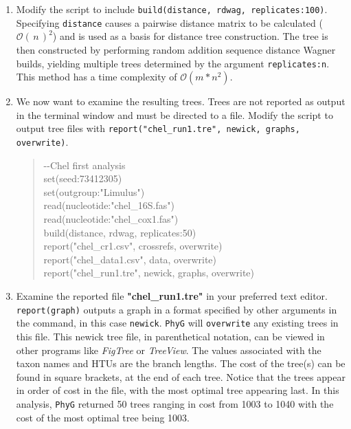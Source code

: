 \documentclass[]{article}
\newcommand{\phyg}{\texttt{PhyG} }
\newcommand{\BigO}[1]{\ensuremath{\mathcal{O}\left(\,#1\,\right)}\xspace}
\begin{document}
\begin{enumerate}

\item Modify the script to include \texttt{build(distance, rdwag, replicates:100)}. 
Specifying \texttt{distance} causes a pairwise distance matrix to be calculated 
($\BigO n^2$) and is used as a basis for distance tree construction. The tree is 
then constructed by performing random addition sequence distance Wagner 
builds, yielding multiple trees determined by the argument \texttt{replicates:n}. 
This method has a time complexity of $\mathcal{O} \left( m*n^2 \right)$.

\item We now want to examine the resulting trees. Trees are not reported as 
output in the terminal window and must be directed to a file. Modify the script 
to output tree files with \texttt{report("chel\_run1.tre", newick, graphs, overwrite)}.

	\begin{quote}
	-\/-Chel first analysis\\
	set(seed:73412305)\\
	set(outgroup:"Limulus")\\
	read(nucleotide:"chel\_16S.fas")\\
	read(nucleotide:"chel\_cox1.fas")\\
	build(distance, rdwag, replicates:50)\\
	report("chel\_cr1.csv", crossrefs, overwrite)\\
	report("chel\_data1.csv", data, overwrite)\\
	report("chel\_run1.tre", newick, graphs, overwrite)\\
	\end{quote}
	
\item Examine the reported file \textbf{"chel\_run1.tre"} in your preferred text editor. 
\texttt{report(graph)} outputs a graph in a format specified by other arguments in the 
command, in this case \texttt{newick}. \phyg will \texttt{overwrite} any existing trees in 
this file. This newick tree file, in parenthetical notation, can be viewed in other programs 
like \textit{FigTree} or \textit{TreeView}. The values associated with the taxon names and 
HTUs are the branch lengths. The cost of the tree(s) can be found in square brackets, at 
the end of each tree. Notice that the trees appear in order of cost in the file, with the most 
optimal tree appearing last. In this analysis, \phyg returned 50 trees ranging in cost from 
1003 to 1040 with the cost of the most optimal tree being 1003.

\end{enumerate}
\end{document}
